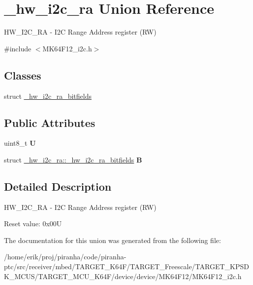 \hypertarget{union__hw__i2c__ra}{}\section{\+\_\+hw\+\_\+i2c\+\_\+ra Union Reference}
\label{union__hw__i2c__ra}


H\+W\+\_\+\+I2\+C\+\_\+\+RA -\/ I2C Range Address register (RW)  




{\ttfamily \#include $<$M\+K64\+F12\+\_\+i2c.\+h$>$}

\subsection*{Classes}
\begin{DoxyCompactItemize}
\item 
struct \hyperlink{struct__hw__i2c__ra_1_1__hw__i2c__ra__bitfields}{\+\_\+hw\+\_\+i2c\+\_\+ra\+\_\+bitfields}
\end{DoxyCompactItemize}
\subsection*{Public Attributes}
\begin{DoxyCompactItemize}
\item 
uint8\+\_\+t {\bfseries U}\hypertarget{union__hw__i2c__ra_a85c137916b5a01570966f2e29a7fddd7}{}\label{union__hw__i2c__ra_a85c137916b5a01570966f2e29a7fddd7}

\item 
struct \hyperlink{struct__hw__i2c__ra_1_1__hw__i2c__ra__bitfields}{\+\_\+hw\+\_\+i2c\+\_\+ra\+::\+\_\+hw\+\_\+i2c\+\_\+ra\+\_\+bitfields} {\bfseries B}\hypertarget{union__hw__i2c__ra_a7f31211c76651b7883da35370720fed5}{}\label{union__hw__i2c__ra_a7f31211c76651b7883da35370720fed5}

\end{DoxyCompactItemize}


\subsection{Detailed Description}
H\+W\+\_\+\+I2\+C\+\_\+\+RA -\/ I2C Range Address register (RW) 

Reset value\+: 0x00U 

The documentation for this union was generated from the following file\+:\begin{DoxyCompactItemize}
\item 
/home/erik/proj/piranha/code/piranha-\/ptc/src/receiver/mbed/\+T\+A\+R\+G\+E\+T\+\_\+\+K64\+F/\+T\+A\+R\+G\+E\+T\+\_\+\+Freescale/\+T\+A\+R\+G\+E\+T\+\_\+\+K\+P\+S\+D\+K\+\_\+\+M\+C\+U\+S/\+T\+A\+R\+G\+E\+T\+\_\+\+M\+C\+U\+\_\+\+K64\+F/device/device/\+M\+K64\+F12/M\+K64\+F12\+\_\+i2c.\+h\end{DoxyCompactItemize}
